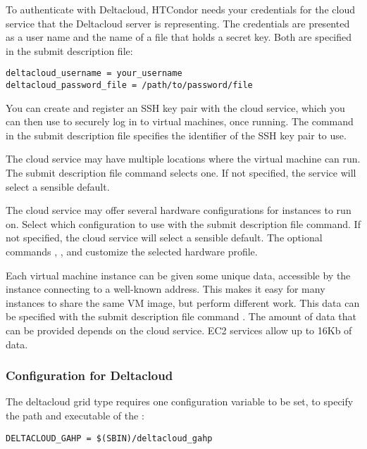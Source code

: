 To authenticate with Deltacloud, HTCondor needs your credentials for
the cloud service that the Deltacloud server is representing. 
The credentials are
presented as a user name and the name of a file that holds a secret key.
Both are specified in the submit description file:

\begin{verbatim}
deltacloud_username = your_username
deltacloud_password_file = /path/to/password/file
\end{verbatim}

You can create and register an SSH key pair with the cloud service,
which you can then use to securely log in to virtual machines,
once running.
The command  in the
submit description file specifies the identifier of the SSH key pair
to use.

The cloud service may have multiple locations where the virtual
machine can run. 
The submit description file command 
selects one.
If not specified, the service will select a sensible default.

The cloud service may offer several hardware configurations for
instances to run on.
Select which configuration to use with the
 submit description file command. 
If not specified, the cloud service will select a sensible default.
The optional commands ,
, and
customize the selected hardware profile.

Each virtual machine instance can be given some unique data, 
accessible by the instance connecting to a well-known address.
This makes it easy for many instances to share the same VM image,
but perform different work.
This data can be specified with the submit description file command
.
The amount of data that can be provided depends on the cloud service.
EC2 services allow up to 16Kb of data.

\subsubsection{\label{sec:Deltacloud-config}Configuration for Deltacloud}

The deltacloud grid type requires one configuration variable 
to be set,
to specify the path and executable of the :

\footnotesize
\begin{verbatim}
DELTACLOUD_GAHP = $(SBIN)/deltacloud_gahp
\end{verbatim}
\normalsize
